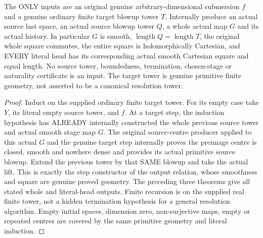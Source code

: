 \begin{theorem}
\label{hir:submersion-cartesian-tower-original-production}
\leanok
{}
The ONLY inputs are an original genuine arbitrary-dimensional submersion
$f$ and a genuine ordinary finite target blowup tower $T$. Internally
produce an actual source last space, an actual source blowup tower $Q$, a
whole actual map $G$ and its actual history. In particular $G$ is smooth,
$\operatorname{length}Q=\operatorname{length}T$, the original whole square
commutes, the entire square is holomorphically Cartesian, and EVERY literal
head has its corresponding actual smooth Cartesian square and equal length.
No source tower, boundedness, termination, chosen-stage or naturality
certificate is an input. The target tower is genuine primitive finite
geometry, not asserted to be a canonical resolution tower.
\end{theorem}
\begin{proof}
Induct on the supplied ordinary finite target tower. For its empty case
take $Y$, its literal empty source tower, and $f$. At a target step, the
induction hypothesis has ALREADY internally constructed the whole previous
source tower and actual smooth stage map $G$. The original source-centre
producer applied to this actual $G$ and the genuine target step internally
proves the preimage centre is closed, smooth and nowhere dense and provides
its actual primitive source blowup. Extend the previous tower by that SAME
blowup and take the actual lift. This is exactly the step constructor of
the output relation, whose smoothness and square are genuine proved geometry.
The preceding three theorems give all stated whole and literal-head outputs.
Finite recursion is on the supplied real finite tower, not a hidden
termination hypothesis for a general resolution algorithm. Empty initial
spaces, dimension zero, non-surjective maps, empty or repeated centres are
covered by the same primitive geometry and literal induction.
\end{proof}

